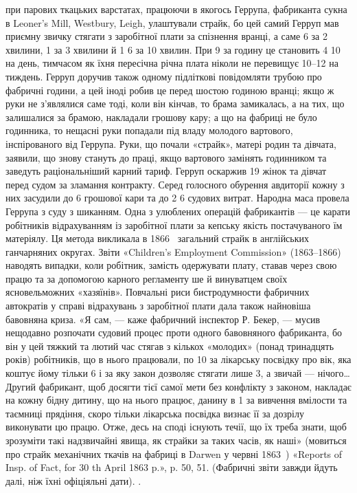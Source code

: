 {при парових ткацьких варстатах, працюючи в якогось Геррупа,
фабриканта сукна в Leoner’s Mill, Westbury, Leigh, улаштували страйк,
бо цей самий Герруп мав приємну звичку стягати з заробітної плати за
спізнення вранці, а саме 6 за 2 хвилини, 1 за 3 хвилини й
1 6 за 10 хвилин. При 9 за годину це становить
4 10 на день, тимчасом як їхня пересічна річна
плата ніколи не перевищує 10--12 на тиждень. Герруп доручив
також одному підліткові повідомляти трубою про фабричні години,
а цей іноді робив це перед шостою годиною вранці; якщо ж руки не з’являлися
саме тоді, коли він кінчав, то брама замикалась, а на тих, що залишалися
за брамою, накладали грошову кару; а що на фабриці не було
годинника, то нещасні руки попадали під владу молодого вартового,
інспірованого від Геррупа. Руки, що почали «страйк», матері родин
та дівчата, заявили, що знову стануть до праці, якщо вартового замінять
годинником та заведуть раціональніший карний тариф. Герруп
оскаржив 19 жінок та дівчат перед судом за зламання контракту. Серед
голосного обурення авдиторії кожну з них засудили до 6 грошової
кари та до 2 6 судових витрат. Народна маса провела
Геррупа з суду з шиканням. Одна з улюблених операцій фабрикантів
— це карати робітників відрахуванням із заробітної плати за
кепську якість постачуваного їм матеріялу. Ця метода викликала в 1866~
загальний страйк в англійських ганчарняних округах. Звіти «Children’s
Employment Commission» (1863--1866) наводять випадки, коли робітник,
замість одержувати плату, ставав через свою працю та за допомогою
карного регламенту ше й винуватцем своїх ясновельможних «хазяїнів».
Повчальні риси бистродумности фабричних автократів у справі відрахувань
з заробітної плати дала також найновіша бавовняна криза.
«Я сам, — каже фабричний інспектор Р. Бекер, — мусив нещодавно розпочати
судовий процес проти одного бавовняного фабриканта, бо він у цей тяжкий
та лютий час стягав з кількох «молодих» (понад тринадцять років)
робітників, що в нього працювали, по 10 за лікарську посвідку
про вік, яка коштує йому тільки 6 і за яку закон дозволяє стягати
лише 3, а звичай — нічого\dots{} Другий фабрикант, щоб досягти
тієї самої мети без конфлікту з законом, накладає на кожну бідну дитину,
що на нього працює, данину в 1 за вивчення вмілости та
таємниці прядіння, скоро тільки лікарська посвідка визнає її за дозрілу
виконувати цю працю. Отже, десь на споді існують течії, що їх треба знати,
щоб зрозуміти такі надзвичайні явища, як страйки за таких часів, як
наші» (мовиться про страйк механічних ткачів на фабриці в Darwen у
червні 1863~) «Reports of Insp. of Fact, for 30 th April 1863 p.», p. 50,
51. (Фабричні звіти завжди йдуть далі, ніж їхні офіціяльні дати).
}.

